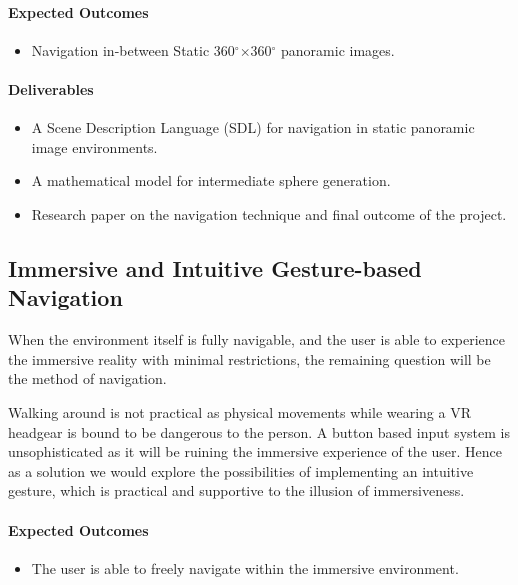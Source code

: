 \paragraph{\textbf{Expected Outcomes}}
\begin{itemize}
\item{Navigation in-between Static 360$^{\circ}$$\times$360$^{\circ}$ panoramic images.}
\end{itemize}

\paragraph{\textbf{Deliverables}}
\begin{itemize}
\item{A Scene Description Language (SDL) for navigation in static panoramic image environments.}
\item{A mathematical model for intermediate sphere generation.}
\item{Research paper on the navigation technique and final outcome of the project.}
\end{itemize}

\subsection{Immersive and Intuitive Gesture-based Navigation}
\label{intro_subsec:3_4}

When the environment itself is fully navigable, and the user is able to experience the immersive reality with minimal restrictions, the remaining question will be the method of navigation.

Walking around is not practical as physical movements while wearing a VR headgear is bound to be dangerous to the person. A button based input system is unsophisticated as it will be ruining the immersive experience of the user. Hence as a solution we would explore the possibilities of implementing an intuitive gesture, which is practical and supportive to the illusion of immersiveness.

\paragraph{\textbf{Expected Outcomes}}
\begin{itemize}
\item{The user is able to freely navigate within the immersive environment.}
\end{itemize}

